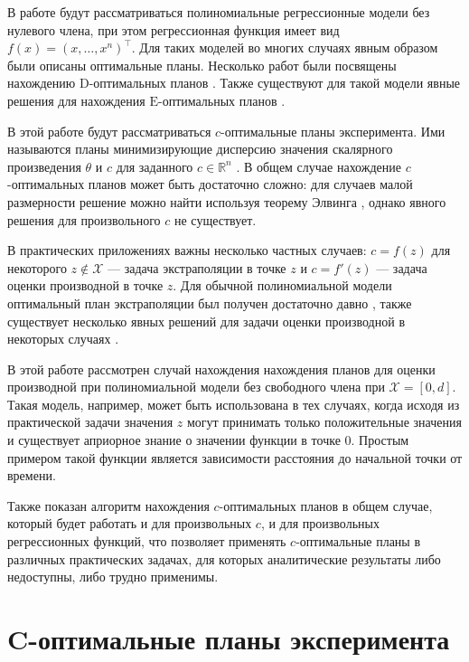 \documentclass[specialist,
               substylefile = spbu.rtx,
               subf,href,colorlinks=true, 12pt]{disser}
\theoremstyle{definition}
\begin{document}
  В работе будут рассматриваться полиномиальные регрессионные модели без нулевого члена, при этом регрессионная функция имеет вид $f(x) = (x, \ldots, x^n)^\top$. Для таких моделей во многих случаях явным образом были описаны оптимальные планы. Несколько работ были посвящены нахождению $\mathrm{D}$-оптимальных планов \cite{hoel1958, studden1980, dette1990, dette2001}. Также существуют для такой модели явные решения для нахождения $\mathrm{E}$-оптимальных планов \cite{pukelsheim1993, dette1993, heiligers1994, dette1993_2}.
  
  В этой работе будут рассматриваться $c$-оптимальные планы эксперимента. Ими называются планы минимизирующие дисперсию значения скалярного произведения $\theta$ и $c$ для заданного $c \in \mathbb{R}^n$ \cite{dette1993_2}. В общем случае нахождение $c$-оптимальных планов может быть достаточно сложно: для случаев малой размерности решение можно найти используя теорему Элвинга \cite{elfving1952}, однако явного решения для произвольного $c$ не существует.
  
  В практических приложениях важны несколько частных случаев: $c = f(z)$ для некоторого $z \notin \mathcal{X}$ --- задача экстраполяции в точке $z$ и $c = f'(z)$ --- задача оценки производной в точке $z$. Для обычной полиномиальной модели оптимальный план экстраполяции был получен достаточно давно \cite{hoel1964}, также существует несколько явных решений для задачи оценки производной в некоторых случаях \cite{melas2010, melasmain}.
  
  В этой работе рассмотрен случай нахождения нахождения планов для оценки производной при полиномиальной модели без свободного члена при $\mathcal{X} = [0, d]$. Такая модель, например, может быть использована в тех случаях, когда исходя из практической задачи значения $z$ могут принимать только положительные значения и существует априорное знание о значении функции в точке 0. Простым примером такой функции является зависимости расстояния до начальной точки от времени.
  
  Также показан алгоритм нахождения $c$-оптимальных планов в общем случае, который будет работать и для произвольных $c$, и для произвольных регрессионных функций, что позволяет применять $c$-оптимальные планы в различных практических задачах, для которых аналитические результаты либо недоступны, либо трудно применимы.
  
  
  

\chapter{C-оптимальные планы эксперимента}
\end{document}
